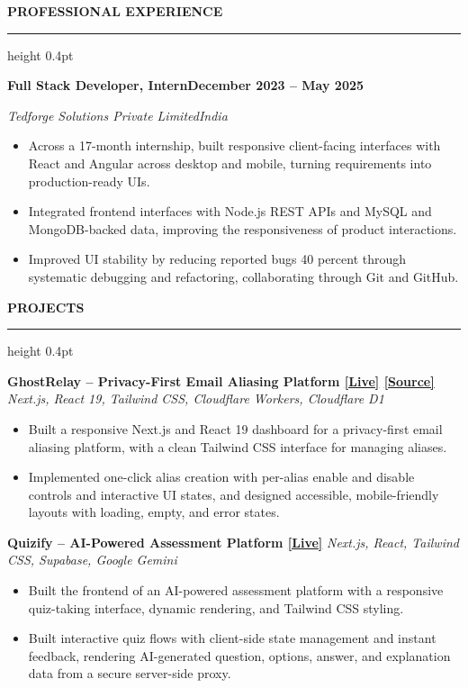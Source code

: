 \documentclass[10pt,a4paper]{article}
\newcommand{\resumeSection}[1]{%
  \vspace{5pt}
  {\normalsize\bfseries\color{heading} #1}\par
  \vspace{1pt}
  {\color{rulecolor}\hrule height 0.4pt}
  \vspace{3pt}
}
\newcommand{\resumeSubheading}[4]{%
  \textbf{#1}\hfill\textbf{#2}\par
  \textit{#3}\hfill\textit{#4}\par
  \vspace{-0.15em}
}
\newcommand{\projectHeading}[2]{%
  \textbf{#1} \textbar{} \textit{#2}\par
  \vspace{-0.15em}
}
\begin{document}
\normalsize

\resumeSection{PROFESSIONAL EXPERIENCE}

\resumeSubheading
{Full Stack Developer, Intern}
{December 2023 -- May 2025}
{Tedforge Solutions Private Limited}
{India}

\begin{itemize}
  \item Across a 17-month internship, built responsive client-facing
  interfaces with React and Angular across desktop and mobile, turning
  requirements into production-ready UIs.

  \item Integrated frontend interfaces with Node.js REST APIs and MySQL and
  MongoDB-backed data, improving the responsiveness of product interactions.

  \item Improved UI stability by reducing reported bugs 40 percent through
  systematic debugging and refactoring, collaborating through Git and GitHub.
\end{itemize}

\resumeSection{PROJECTS}

\projectHeading
{GhostRelay -- Privacy-First Email Aliasing Platform \href{https://ghostrelay.me}{[Live]} \href{https://github.com/Tech-aficionado/GhostRelay---Open-Source}{[Source]}}
{Next.js, React 19, Tailwind CSS, Cloudflare Workers, Cloudflare D1}

\begin{itemize}
  \item Built a responsive Next.js and React 19 dashboard for a privacy-first
  email aliasing platform, with a clean Tailwind CSS interface for managing
  aliases.

  \item Implemented one-click alias creation with per-alias enable and
  disable controls and interactive UI states, and designed accessible,
  mobile-friendly layouts with loading, empty, and error states.
\end{itemize}

\projectHeading
{Quizify -- AI-Powered Assessment Platform \href{https://quizify.0xshiv.dev}{[Live]}}
{Next.js, React, Tailwind CSS, Supabase, Google Gemini}

\begin{itemize}
  \item Built the frontend of an AI-powered assessment platform with a
  responsive quiz-taking interface, dynamic rendering, and Tailwind CSS
  styling.

  \item Built interactive quiz flows with client-side state management and
  instant feedback, rendering AI-generated question, options, answer, and
  explanation data from a secure server-side proxy.
\end{itemize}
\end{document}
